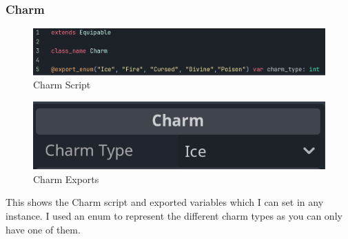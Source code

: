 \documentclass{article}
\begin{document}
        \subsubsection{Charm}
        \begin{multicols}{2}
                \begin{figure}[H]
                        \centering
                        \includegraphics[width = \columnwidth]{images/development/Charm_script.PNG}
                        \caption{Charm Script}
                \end{figure}
                \begin{figure}[H]
                        \centering
                        \includegraphics[width = 0.9\columnwidth]{images/development/Charm_export.PNG}
                        \caption{Charm Exports}
                \end{figure}
        \end{multicols}
        \[\]
        This shows the Charm script and exported variables which I can set in any instance. I used an enum to represent the different charm types as you can only have one of them.\\
\end{document}
